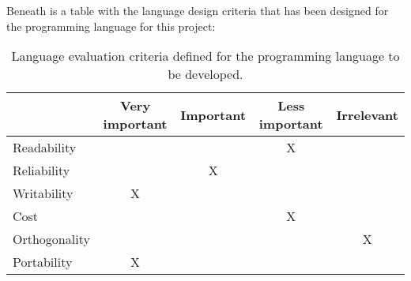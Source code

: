 Beneath is a table with the language design criteria that has been designed for the programming language for this project:
\begin{table}[htbp]
\centering
\begin{tabular}{|l|c|c|c|c|}
\hline
& Very important & Important & Less important & Irrelevant \\ \hline
Readability & & & X & \\ \hline
Reliability & & X & & \\ \hline
Writability & X & & & \\ \hline
Cost & & & X & \\ \hline
Orthogonality & & & & X \\ \hline
Portability & X & & & \\ \hline
\end{tabular}
\caption{Language evaluation criteria defined for the programming language to be developed.}
\label{tbl:evaluation criteria}
\end{table}